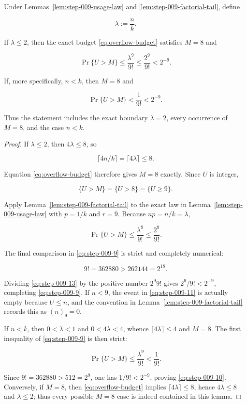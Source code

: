 \begin{lemma}\label{lem:step-009-small-mean}
Under Lemmas~\ref{lem:step-009-usage-law} and
\ref{lem:step-009-factorial-tail}, define

\[
\lambda:=\frac nk.
\tag{S9.8}\label{eq:step-009-8}
\]

If \(\lambda\le2\), then the exact budget \eqref{eq:overflow-budget} satisfies \(M=8\) and

\[
\Pr\{U>M\}
\le\frac{\lambda^9}{9!}
\le\frac{2^9}{9!}
<2^{-9}.
\tag{S9.9}\label{eq:step-009-9}
\]

If, more specifically, \(n<k\), then \(M=8\) and

\[
\Pr\{U>M\}<\frac1{9!}<2^{-9}.
\tag{S9.10}\label{eq:step-009-10}
\]

Thus the statement includes the exact boundary \(\lambda=2\), every
occurrence of \(M=8\), and the case \(n<k\).
\end{lemma}

\begin{proof}
If \(\lambda\le2\), then \(4\lambda\le8\), so

\[
\lceil4n/k\rceil=\lceil4\lambda\rceil\le8.
\]

Equation \eqref{eq:overflow-budget} therefore gives \(M=8\) exactly. Since \(U\) is integer,

\[
\{U>M\}=\{U>8\}=\{U\ge9\}.
\tag{S9.11}\label{eq:step-009-11}
\]

Apply Lemma~\ref{lem:step-009-factorial-tail} to the exact law in
Lemma~\ref{lem:step-009-usage-law} with \(p=1/k\) and \(r=9\). Because
\(np=n/k=\lambda\),

\[
\Pr\{U>M\}\le\frac{\lambda^9}{9!}
\le\frac{2^9}{9!}.
\tag{S9.12}\label{eq:step-009-12}
\]

The final comparison in \eqref{eq:step-009-9} is strict and completely numerical:

\[
9!=362880>262144=2^{18}.
\tag{S9.13}\label{eq:step-009-13}
\]

Dividing \eqref{eq:step-009-13} by the positive number \(2^9 9!\) gives
\(2^9/9!<2^{-9}\), completing \eqref{eq:step-009-9}. If \(n<9\), the event in \eqref{eq:step-009-11} is
actually empty because \(U\le n\), and the convention in
Lemma~\ref{lem:step-009-factorial-tail} records this as \((n)_9=0\).

If \(n<k\), then \(0<\lambda<1\) and
\(0<4\lambda<4\), whence \(\lceil4\lambda\rceil\le4\) and \(M=8\).
The first inequality of \eqref{eq:step-009-9} is then strict:

\[
\Pr\{U>M\}\le\frac{\lambda^9}{9!}<\frac1{9!}.
\]

Since \(9!=362880>512=2^9\), one has \(1/9!<2^{-9}\), proving \eqref{eq:step-009-10}.
Conversely, if \(M=8\), then \eqref{eq:overflow-budget} implies
\(\lceil4\lambda\rceil\le8\), hence \(4\lambda\le8\) and
\(\lambda\le2\); thus every possible \(M=8\) case is indeed contained
in this lemma. \end{proof}

